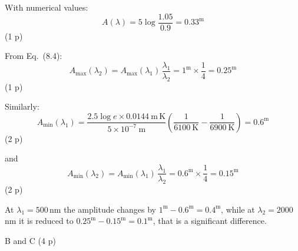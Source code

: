 \begin{description}
  With numerical values:
  \[ A(\lambda) = 5\log\frac{1.05}{0.9} = 0.33^{\mathrm{m}} \]
  \hfill(1 p)
\item[d)] From Eq.\ (8.4):
  \begin{equation*}
  A_{\mathrm{max}}(\lambda_2)
    = A_{\mathrm{max}}(\lambda_1)\,\frac{\lambda_1}{\lambda_2}
    = 1^{\mathrm{m}}\times\frac{1}{4} = 0.25^{\mathrm{m}} \tag{8.7}
  \end{equation*}
  \hfill(1 p)

  Similarly:
  \[ A_{\mathrm{min}}(\lambda_1)
     = \frac{2.5\log e\times 0.0144\ \mathrm{m\,K}}
            {5\times 10^{-7}\ \mathrm{m}}
       \left(\frac{1}{6100\ \mathrm{K}}
       - \frac{1}{6900\ \mathrm{K}}\right)
     = 0.6^{\mathrm{m}} \]
  \hfill(2 p)

  and
  \[ A_{\mathrm{min}}(\lambda_2)
     = A_{\mathrm{min}}(\lambda_1)\,\frac{\lambda_1}{\lambda_2}
     = 0.6^{\mathrm{m}}\times\frac{1}{4} = 0.15^{\mathrm{m}} \]
  \hfill(2 p)

  At $\lambda_1 = 500$\,nm the amplitude changes by
  $1^{\mathrm{m}} - 0.6^{\mathrm{m}} = 0.4^{\mathrm{m}}$, while at
  $\lambda_2 = 2000$\,nm it is reduced to
  $0.25^{\mathrm{m}} - 0.15^{\mathrm{m}} = 0.1^{\mathrm{m}}$, that is a
  significant difference.
\item[e)] B and C \hfill(4 p)
\end{description}

